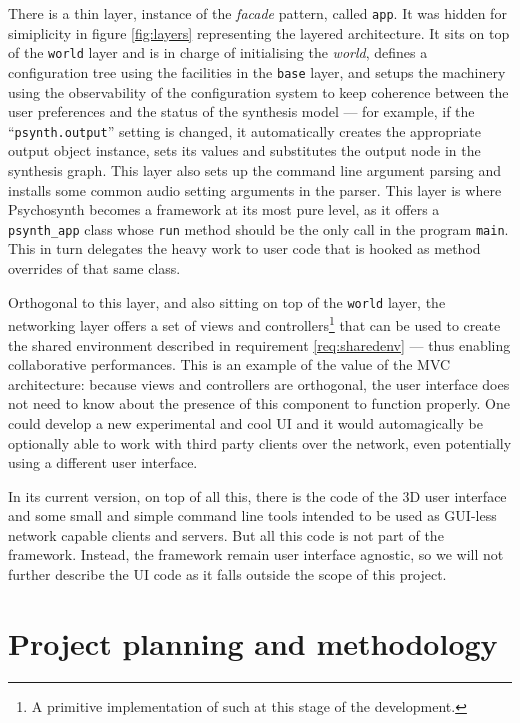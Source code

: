 There is a thin layer, instance of the \emph{facade}
pattern, called \texttt{app}. It was
hidden for simiplicity in figure \ref{fig:layers} representing the
layered architecture. It sits on top of the \texttt{world} layer and
is in charge of initialising the \emph{world}, defines a configuration
tree using the facilities in the \texttt{base} layer, and setups the
machinery using the observability of the configuration system to keep
coherence between the user preferences and the status of the synthesis
model --- for example, if the ``\texttt{psynth.output}'' setting is
changed, it automatically creates the appropriate output object
instance, sets its values and substitutes the output node in the
synthesis graph. This layer also sets up the command line argument
parsing and installs some common audio setting arguments in the
parser. This layer is where Psychosynth becomes a
framework at its most pure level, as it offers a
\texttt{psynth\_app} class whose \texttt{run} method should be the
only call in the program \texttt{main}. This in turn delegates the
heavy work to user code that is hooked as method overrides of that
same class.

Orthogonal to this layer, and also sitting on top of the
\texttt{world} layer, the networking layer offers a
set of views and controllers\footnote{A primitive implementation of
  such at this stage of the development.}  that can be used to create
the shared environment described in requirement \ref{req:sharedenv}
--- thus enabling collaborative performances. This is an example of
the value of the MVC architecture: because views and controllers are
orthogonal, the user interface does not need to know about the
presence of this component to function properly. One could develop a
new experimental and cool UI and it would automagically be optionally
able to work with third party clients over the network, even
potentially using a different user interface.

In its current version, on top of all this, there is the code of the
3D user interface and some small and simple command line tools
intended to be used as GUI-less network capable clients and
servers. But all this code is not part of the framework. Instead, the
framework remain user interface agnostic, so we will not further
describe the UI code as it falls outside the scope of this project.

\section{Project planning and methodology}

